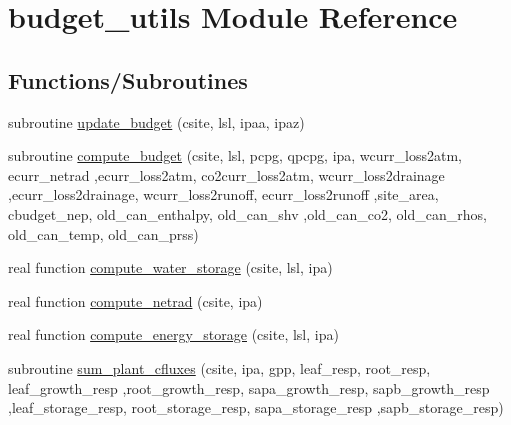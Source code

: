 \hypertarget{namespacebudget__utils}{}\section{budget\+\_\+utils Module Reference}
\label{namespacebudget__utils}
\subsection*{Functions/\+Subroutines}
\begin{DoxyCompactItemize}
\item 
subroutine \hyperlink{namespacebudget__utils_ad8835ee763cd964432b44e0a3d00e3da}{update\+\_\+budget} (csite, lsl, ipaa, ipaz)
\item 
subroutine \hyperlink{namespacebudget__utils_ade80ff8e17018f7bd86015ee5f20375e}{compute\+\_\+budget} (csite, lsl, pcpg, qpcpg, ipa, wcurr\+\_\+loss2atm, ecurr\+\_\+netrad                                                                                                                                               ,ecurr\+\_\+loss2atm, co2curr\+\_\+loss2atm, wcurr\+\_\+loss2drainage                                                                                                                                                   ,ecurr\+\_\+loss2drainage, wcurr\+\_\+loss2runoff, ecurr\+\_\+loss2runoff                                                                                                                                   ,site\+\_\+area, cbudget\+\_\+nep, old\+\_\+can\+\_\+enthalpy, old\+\_\+can\+\_\+shv                                                                                                                                                       ,old\+\_\+can\+\_\+co2, old\+\_\+can\+\_\+rhos, old\+\_\+can\+\_\+temp, old\+\_\+can\+\_\+prss)
\item 
real function \hyperlink{namespacebudget__utils_ad0c764047c557100b3a3cdcd836103a0}{compute\+\_\+water\+\_\+storage} (csite, lsl, ipa)
\item 
real function \hyperlink{namespacebudget__utils_a6111a1c211ecef562368c8635f64af45}{compute\+\_\+netrad} (csite, ipa)
\item 
real function \hyperlink{namespacebudget__utils_a319c5f7252c344bcebbd162593e25ec8}{compute\+\_\+energy\+\_\+storage} (csite, lsl, ipa)
\item 
subroutine \hyperlink{namespacebudget__utils_a117874382f22a7cb0883681d23606828}{sum\+\_\+plant\+\_\+cfluxes} (csite, ipa, gpp, leaf\+\_\+resp, root\+\_\+resp, leaf\+\_\+growth\+\_\+resp                                                                                                                                               ,root\+\_\+growth\+\_\+resp, sapa\+\_\+growth\+\_\+resp, sapb\+\_\+growth\+\_\+resp                                                                                                                                                       ,leaf\+\_\+storage\+\_\+resp, root\+\_\+storage\+\_\+resp, sapa\+\_\+storage\+\_\+resp                                                                                                                                           ,sapb\+\_\+storage\+\_\+resp)

\end{DoxyCompactItemize}
